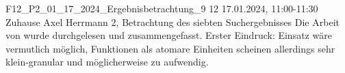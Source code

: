 \fieldnote
{F12\_P2\_01\_17\_2024\_Ergebnisbetrachtung\_9}
{12}
{17.01.2024, 11:00-11:30}
{Zuhause}
{Axel Herrmann}
{2, Betrachtung des siebten Suchergebnisses}
{
  Die Arbeit von  wurde durchgelesen und zusammengefasst.
}
{
}
{
}
{}
{
  Erster Eindruck: Einsatz wäre vermutlich möglich, Funktionen als atomare Einheiten scheinen allerdings sehr klein-granular und möglicherweise zu aufwendig.
}
